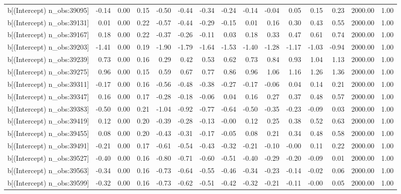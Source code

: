 \begin{table}[ht]
\begin{tabular}{rrrrrrrrrrrrrrr}
  b[(Intercept) n\_obs:39095] & -0.14 & 0.00 & 0.15 & -0.50 & -0.44 & -0.34 & -0.24 & -0.14 & -0.04 & 0.05 & 0.15 & 0.23 & 2000.00 & 1.00 \\ 
  b[(Intercept) n\_obs:39131] & 0.01 & 0.00 & 0.22 & -0.57 & -0.44 & -0.29 & -0.15 & 0.01 & 0.16 & 0.30 & 0.43 & 0.55 & 2000.00 & 1.00 \\ 
  b[(Intercept) n\_obs:39167] & 0.18 & 0.00 & 0.22 & -0.37 & -0.26 & -0.11 & 0.03 & 0.18 & 0.33 & 0.47 & 0.61 & 0.74 & 2000.00 & 1.00 \\ 
  b[(Intercept) n\_obs:39203] & -1.41 & 0.00 & 0.19 & -1.90 & -1.79 & -1.64 & -1.53 & -1.40 & -1.28 & -1.17 & -1.03 & -0.94 & 2000.00 & 1.00 \\ 
  b[(Intercept) n\_obs:39239] & 0.73 & 0.00 & 0.16 & 0.29 & 0.42 & 0.53 & 0.62 & 0.73 & 0.84 & 0.93 & 1.04 & 1.13 & 2000.00 & 1.00 \\ 
  b[(Intercept) n\_obs:39275] & 0.96 & 0.00 & 0.15 & 0.59 & 0.67 & 0.77 & 0.86 & 0.96 & 1.06 & 1.16 & 1.26 & 1.36 & 2000.00 & 1.00 \\ 
  b[(Intercept) n\_obs:39311] & -0.17 & 0.00 & 0.16 & -0.56 & -0.48 & -0.38 & -0.27 & -0.17 & -0.06 & 0.04 & 0.14 & 0.21 & 2000.00 & 1.00 \\ 
  b[(Intercept) n\_obs:39347] & 0.16 & 0.00 & 0.17 & -0.28 & -0.18 & -0.06 & 0.04 & 0.16 & 0.27 & 0.37 & 0.48 & 0.57 & 2000.00 & 1.00 \\ 
  b[(Intercept) n\_obs:39383] & -0.50 & 0.00 & 0.21 & -1.04 & -0.92 & -0.77 & -0.64 & -0.50 & -0.35 & -0.23 & -0.09 & 0.03 & 2000.00 & 1.00 \\ 
  b[(Intercept) n\_obs:39419] & 0.12 & 0.00 & 0.20 & -0.39 & -0.28 & -0.13 & -0.00 & 0.12 & 0.25 & 0.38 & 0.52 & 0.63 & 2000.00 & 1.00 \\ 
  b[(Intercept) n\_obs:39455] & 0.08 & 0.00 & 0.20 & -0.43 & -0.31 & -0.17 & -0.05 & 0.08 & 0.21 & 0.34 & 0.48 & 0.58 & 2000.00 & 1.00 \\ 
  b[(Intercept) n\_obs:39491] & -0.21 & 0.00 & 0.17 & -0.61 & -0.54 & -0.43 & -0.32 & -0.21 & -0.10 & -0.00 & 0.11 & 0.22 & 2000.00 & 1.00 \\ 
  b[(Intercept) n\_obs:39527] & -0.40 & 0.00 & 0.16 & -0.80 & -0.71 & -0.60 & -0.51 & -0.40 & -0.29 & -0.20 & -0.09 & 0.01 & 2000.00 & 1.00 \\ 
  b[(Intercept) n\_obs:39563] & -0.34 & 0.00 & 0.16 & -0.73 & -0.64 & -0.55 & -0.46 & -0.34 & -0.23 & -0.14 & -0.02 & 0.06 & 2000.00 & 1.00 \\ 
  b[(Intercept) n\_obs:39599] & -0.32 & 0.00 & 0.16 & -0.73 & -0.62 & -0.51 & -0.42 & -0.32 & -0.21 & -0.11 & -0.00 & 0.05 & 2000.00 & 1.00 \\ 

\end{tabular}
\end{table}
